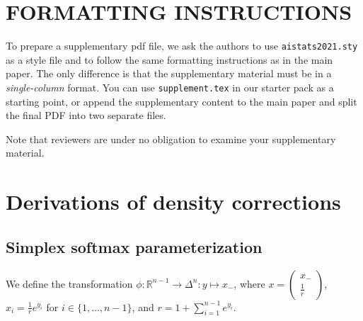 \documentclass[twoside]{article}
\begin{document}
%

%

\onecolumn
{}

\section{FORMATTING INSTRUCTIONS}

To prepare a supplementary pdf file, we ask the authors to use \texttt{aistats2021.sty} as a style file and to follow the same formatting instructions as in the main paper.
The only difference is that the supplementary material must be in a \emph{single-column} format.
You can use \texttt{supplement.tex} in our starter pack as a starting point, or append the supplementary content to the main paper and split the final PDF into two separate files.

Note that reviewers are under no obligation to examine your supplementary material.

\section{Derivations of density corrections}

\subsection{Simplex softmax parameterization}

We define the transformation $\phi: \mathbb{R}^{n-1} \to \Delta^{n}: y \mapsto x_-$, where $x=\begin{pmatrix}x_- \\ \frac{1}{r}\end{pmatrix}$, $x_i = \frac{1}{r} e^{y_i}$ for $i \in \{1, \ldots, n-1\}$, and $r = 1 + \sum_{i=1}^{n-1} e^{y_i}$.
\end{document}
